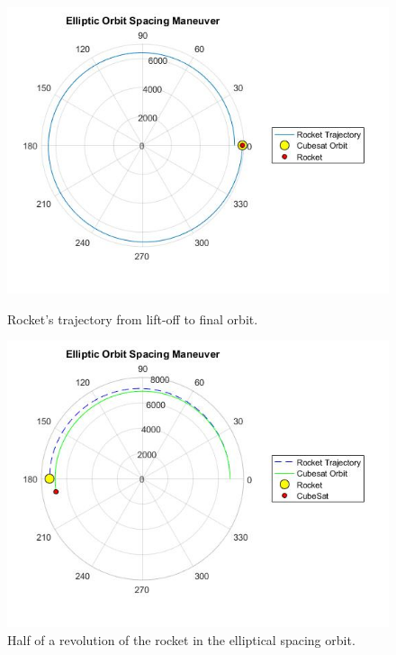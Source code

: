 \begin{figure}[H]
\includegraphics[scale=0.7]{./sections/Constellation_Deployment/S4-First_Placement/Images_S4/Picture_3_S4.jpg}
\caption{Rocket's trajectory from lift-off to final orbit.}
\label{orbit1}
\includegraphics[scale=0.7]{./sections/Constellation_Deployment/S4-First_Placement/Images_S4/Picture_4_S4.jpg}
\caption{Half of a revolution of the rocket in the elliptical spacing orbit.}
\label{orbit2}
\end{figure}
